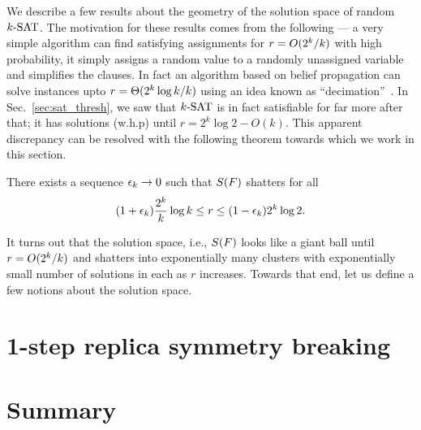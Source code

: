 \documentclass[letterpaper, 10pt, twocolumn, reqno]{amsart}
\begin{document}
We describe a few results about the geometry of the solution space of random $\ksat$. The motivation for these results comes from the following --- a very
simple algorithm can find satisfying assignments for $r = \bigo(2^k/k)$ with
high probability, it simply assigns a random value to a randomly unassigned variable and simplifies the clauses. In fact an algorithm based on belief
propagation can solve instances upto $r = \bigth(2^k \log k/k)$ using an idea known as ``decimation''~\cite{montanari2007solving}. In Sec.~\ref{sec:sat_thresh}, we saw that $\ksat$ is in fact satisfiable for far more after that; it has solutions (w.h.p) until $r = 2^k \log 2 - O(k)$. This apparent discrepancy can
be resolved with the following theorem towards which we work in this section.
\begin{theorem}
There exists a sequence $\e_k \to 0$ such that $\sf$ shatters for all
$$
(1 + \e_k) \f{2^k}{k} \log k \leq r \leq (1-\e_k) 2^k \log 2.
$$
\label{thm:shatter}
\end{theorem}
%
It turns out that the solution space, i.e., $\sf$ looks like a giant ball
until $r = \bigo(2^k/k)$ and shatters into exponentially many clusters with
exponentially small number of solutions in each as $r$ increases. Towards that end, let us define a few notions about the solution space.


\section{1-step replica symmetry breaking}
\label{sec:1rsb}

\section{Summary}
\label{sec:summary}



{
\small


}
\end{document}
